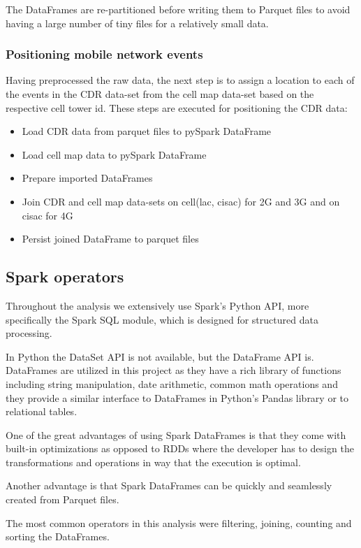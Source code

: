 The DataFrames are re-partitioned before writing them to Parquet files to avoid having a large number of tiny files for a relatively small data. 

\subsubsection{Positioning mobile network events}
Having preprocessed the raw data, the next step is to assign a location to each of the events in the CDR data-set from the cell map data-set based on the respective cell tower id. 
These steps are executed for positioning the CDR data:
\begin{itemize}
    \item Load CDR data from parquet files to pySpark DataFrame
    \item Load cell map data to pySpark DataFrame
    \item Prepare imported DataFrames
    \item Join CDR and cell map data-sets on cell(lac, cisac) for 2G and 3G and on cisac for 4G
    \item Persist joined DataFrame to parquet files
\end{itemize}

\subsection{Spark operators}
Throughout the analysis we extensively use Spark's Python API, more specifically the Spark SQL module, which is designed for structured data processing.

In Python the DataSet API is not available, but the DataFrame API is. DataFrames are utilized in this project as they have a rich library of functions including string manipulation, date arithmetic, common math operations and they provide a similar interface to DataFrames in Python's Pandas library or to relational tables.

One of the great advantages of using Spark DataFrames is that they come with built-in optimizations as opposed to RDDs where the developer has to design the transformations and operations in way that the execution is optimal.

Another advantage is that Spark DataFrames can be quickly and seamlessly created from Parquet files.

The most common operators in this analysis were filtering, joining, counting and sorting the DataFrames. 